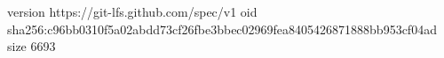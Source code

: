 version https://git-lfs.github.com/spec/v1
oid sha256:c96bb0310f5a02abdd73cf26fbe3bbec02969fea8405426871888bb953cf04ad
size 6693
